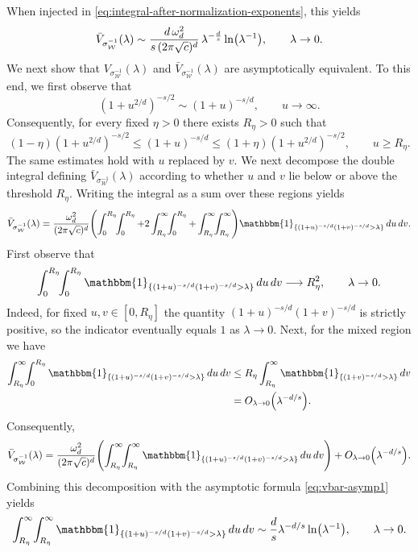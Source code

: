 \documentclass[a4paper,12pt]{article}
\let\originalleft\left
\let\originalright\right
\renewcommand{\left}{\mathopen{}\mathclose\bgroup\originalleft}
\renewcommand{\right}{\aftergroup\egroup\originalright}
\newcommand{\symbolnotsobw}{\symbolnot_{\mathcal{W}}}
\newcommand{\symbolnot}{\sigma}
\begin{document}
When injected in \eqref{eq:integral-after-normalization-exponents}, 
this yields 
\begin{equation}\label{eq:vbar-asymp1}
\bar V_{\symbolnotsobw^{-1}}(\lambda)
\sim
\frac{d\, \omega_d^2}{s\, (2\pi\sqrt{c})^{d}}
\, \lambda^{-\frac{d}{s}}\ln\left(\lambda^{-1}\right),
\qquad \lambda\to0.
\end{equation}
\fi 
We next show that $V_{\symbolnotsobw^{-1}}(\lambda)$ and
$\bar V_{\symbolnotsobw^{-1}}(\lambda)$ are asymptotically equivalent.
To this end, we first observe that
\[
(1+u^{2/d})^{-s/2} \sim (1+u)^{-s/d},
\qquad u\to\infty.
\]
Consequently, for every fixed $\eta>0$ there exists $R_\eta>0$ such that
\begin{equation}\label{eq:r-eta-inequalities}
(1-\eta)(1+u^{2/d})^{-s/2}
\le (1+u)^{-s/d}
\le (1+\eta)(1+u^{2/d})^{-s/2},
\qquad u\ge R_\eta .
\end{equation}
The same estimates hold with $u$ replaced by $v$. We next decompose the double integral defining $\bar V_{\symbolnotsobw^{-1}}(\lambda)$
according to whether $u$ and $v$ lie below or above the threshold $R_\eta$.
Writing the integral as a sum over these regions yields
\[
\bar V_{\symbolnotsobw^{-1}}(\lambda)
=
\frac{\omega_d^2}{(2\pi\sqrt{c})^{d}}
\left(
\int_{0}^{R_\eta}\!\!\int_{0}^{R_\eta}
+
2\int_{R_\eta}^{\infty}\!\!\int_{0}^{R_\eta}
+
\int_{R_\eta}^{\infty}\!\!\int_{R_\eta}^{\infty}
\right)
\mathbbm{1}_{\{(1+u)^{-s/d}(1+v)^{-s/d}>\lambda\}}
\,du\,dv .
\]
First observe that
\[
\int_{0}^{R_\eta}\!\!\int_{0}^{R_\eta}
\mathbbm{1}_{\{(1+u)^{-s/d}(1+v)^{-s/d}>\lambda\}}
\,du\,dv
\longrightarrow R_\eta^{2},
\qquad \lambda\to0 .
\]
Indeed, for fixed $u,v\in[0,R_\eta]$ the quantity
$(1+u)^{-s/d}(1+v)^{-s/d}$ is strictly positive, so the indicator
eventually equals $1$ as $\lambda\to0$. Next, for the mixed region we have
\begin{align*}
\int_{R_\eta}^{\infty}\!\!\int_{0}^{R_\eta}
\mathbbm{1}_{\{(1+u)^{-s/d}(1+v)^{-s/d}>\lambda\}}
\,du\,dv
&\le
R_\eta
\int_{R_\eta}^{\infty}
\mathbbm{1}_{\{(1+v)^{-s/d}>\lambda\}}\,dv \\
&=
O_{\lambda\to0} \left(\lambda^{-d/s}\right).
\end{align*}
Consequently,
\[
\bar V_{\symbolnotsobw^{-1}}(\lambda)
=
\frac{\omega_d^{2}}{(2\pi\sqrt{c})^{d}}
\left(
\int_{R_\eta}^{\infty}\!\!\int_{R_\eta}^{\infty}
\mathbbm{1}_{\{(1+u)^{-s/d}(1+v)^{-s/d}>\lambda\}}
\,du\,dv
\right)
+
O_{\lambda\to0} \left(\lambda^{-d/s}\right).
\]
Combining this decomposition with the asymptotic formula
\eqref{eq:vbar-asymp1} yields
\begin{equation}\label{eq:limit-double-int-simple-form}
\int_{R_\eta}^{\infty}\!\int_{R_\eta}^{\infty}
\mathbbm{1}_{\{(1+u)^{-s/d}(1+v)^{-s/d}>\lambda\}}
\,du\,dv
\sim
\frac{d}{s}\lambda^{-d/s}\ln \left(\lambda^{-1}\right),
\qquad \lambda\to 0.
\end{equation}
\end{document}
